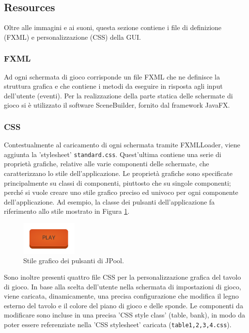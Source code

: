 \documentclass[12pt,a4paper]{report}
\begin{document}
\pagebreak

\subsection{Resources} \label{se:Resources} %

Oltre alle immagini e ai suoni, questa sezione contiene i file di definizione (FXML) e personalizzazione (CSS) della GUI.

\subsubsection*{FXML}
Ad ogni schermata di gioco corrisponde un file FXML che ne definisce la struttura grafica e che contiene i metodi da eseguire in risposta agli input dell'utente (eventi).
Per la realizzazione della parte statica delle schermate di gioco si è utilizzato il software SceneBuilder, fornito dal framework JavaFX. \cite{JavaFX}

\subsubsection*{CSS}
Contestualmente al caricamento di ogni schermata tramite FXMLLoader, viene aggiunta la 'stylesheet' \texttt{standard.css}.
Quest'ultima contiene una serie di proprietà grafiche, relative alle varie componenti delle schermate, che caratterizzano lo stile dell'applicazione.
Le proprietà grafiche sono specificate principalmente su classi di componenti, piuttosto che su singole componenti; perché si vuole creare uno stile grafico preciso ed univoco per ogni componente dell'applicazione.
Ad esempio, la classe dei pulsanti dell'applicazione fa riferimento allo stile mostrato in Figura \ref{fig:ButtonStyle}.

\begin{figure}[h]
    \centering
    \includegraphics[width=0.25\textwidth]{ButtonStyle.png}
    \caption{Stile grafico dei pulsanti di JPool.}
    \label{fig:ButtonStyle}
\end{figure}

Sono inoltre presenti quattro file CSS per la personalizzazione grafica del tavolo di gioco.
In base alla scelta dell'utente nella schermata di impostazioni di gioco, viene caricata, dinamicamente, una precisa configurazione che modifica il legno esterno del tavolo e il colore del piano di gioco e delle sponde.
Le componenti da modificare sono incluse in una precisa 'CSS style class' (table, bank), in modo da poter essere referenziate nella 'CSS stylesheet' caricata (\texttt{table1,2,3,4.css}).
\end{document}
